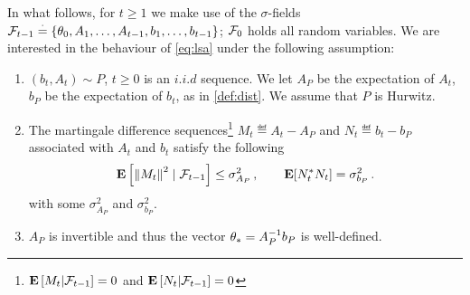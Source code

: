 In what follows, for $t\ge1$ we make use of the $\sigma$-fields $\mathcal{F}_{t-1}\stackrel{\cdot}{=}\{\theta_0,A_1,\ldots, A_{t-1}, b_1,\ldots, b_{t-1}\}$; $\mathcal{F}_0$ holds all random variables. 
We are interested in the behaviour of \eqref{eq:lsa} under the following assumption:
\begin{assumption}\label{assmp:lsa}
\begin{enumerate}[leftmargin=*, before = \leavevmode\vspace{-\baselineskip}]
\item \label{dist} $(b_t, A_t)\sim P$, $t\geq 0$ is an $i.i.d$ sequence.
We let $A_P$ be the expectation of $A_t$, $b_P$ be the expectation of $b_t$, as in \cref{def:dist}.
We assume that $P$ is Hurwitz.
\item \label{matvar} The martingale difference sequences\footnote{$\mathbf{E}\left[M_t|\mathcal{F}_{t-1}\right]=0$ and $\mathbf{E}\left[N_t|\mathcal{F}_{t-1}\right]=0$} $M_t\eqdef A_t-A_{P}$ and $N_t\eqdef b_t-b_{P}$ associated with $A_t$ and $b_t$ satisfy the following
\begin{align*}
	\mathbf{E}\left[ \left\| M_t\right\|^2\mid\mathcal{F}_{t-1}\right]\leq \sigma^2_{A_P}\,, \qquad 
	\mathbf{E}[N_t^* N_t]=\sigma^2_{b_P}\,.
\end{align*}
with some $\sigma^2_{A_P}$ and $\sigma^2_{b_P}$. 
\item $A_P$ is invertible and thus the vector $\theta_*=A^{-1}_Pb_P$ is well-defined. 
\end{enumerate}
\end{assumption}
